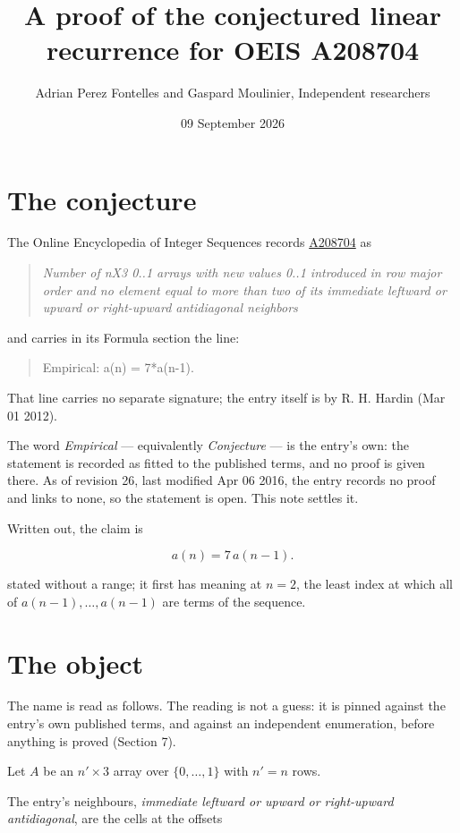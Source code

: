 \documentclass[11pt]{article}
\title{A proof of the conjectured linear recurrence for OEIS A208704}
\author{Adrian Perez Fontelles and Gaspard Moulinier, Independent researchers}
\date{09 September 2026}
\theoremstyle{definition}
\begin{document}
\maketitle
\section{The conjecture}

The Online Encyclopedia of Integer Sequences records \href{https://oeis.org/A208704}{A208704} as

\begin{quote}\itshape Number of nX3 0..1 arrays with new values 0..1 introduced in row major order and no element equal to more than two of its immediate leftward or upward or right-upward antidiagonal neighbors\end{quote}

and carries in its Formula section the line:

\begin{quote}\ttfamily Empirical: a(n) = 7*a(n-1).\end{quote}

That line carries no separate signature; the entry itself is by R. H. Hardin (Mar 01 2012).

The word {\itshape Empirical} --- equivalently {\itshape Conjecture} --- is the entry's own: the statement is recorded as fitted to the published terms, and no proof is given there. As of revision 26, last modified Apr 06 2016, the entry records no proof and links to none, so the statement is open. This note settles it.

Written out, the claim is

\[a(n) = 7\,a(n-1).\]

stated without a range; it first has meaning at $n = 2$, the least index at which all of $a(n-1),\dots,a(n-1)$ are terms of the sequence.

\section{The object}

The name is read as follows. The reading is not a guess: it is pinned against the entry's own published terms, and against an independent enumeration, before anything is proved (Section 7).

Let $A$ be an $n' \times 3$ array over $\{0,\dots,1\}$ with $n' = n$ rows.

The entry's neighbours, {\itshape immediate leftward or upward or right-upward antidiagonal}, are the cells at the offsets
\end{document}
